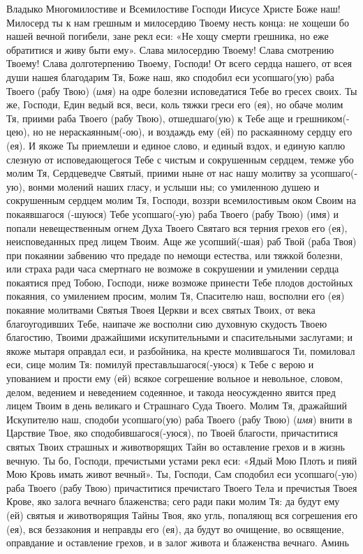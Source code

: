 \begin{mymulticols}
 




Владыко Многомилостиве и Всемилостиве Господи Иисусе Христе Боже наш! Милосерд ты к нам грешным и милосердию Твоему несть конца: не хощеши бо нашей вечной погибели, зане рекл еси: «Не хощу смерти грешника, но еже обратитися и живу быти ему». Слава милосердию Твоему! Слава смотрению Твоему! Слава долготерпению Твоему, Господи! От всего сердца нашего, от всея души нашея благодарим Тя, Боже наш, яко сподобил еси усопшаго(ую) раба Твоего (рабу Твою) ({\itshape имя}) на одре болезни исповедатися Тебе во гресех своих. Ты же, Господи, Един ведый вся, веси, коль тяжки греси его (ея), но обаче молим Тя, приими раба Твоего (рабу Твою), отшедшаго(ую) к Тебе аще и грешником(-цею), но не нераскаянным(-ою), и воздаждь ему (ей) по раскаянному сердцу его (ея). И якоже Ты приемлеши и единое слово, и единый вздох, и единую каплю слезную от исповедающегося Тебе с чистым и сокрушенным сердцем, темже убо молим Тя, Сердцеведче Святый, приими ныне от нас нашу молитву за усопшаго(-ую), вонми молений наших гласу, и услыши ны; со умиленною душею и сокрушенным сердцем молим Тя, Господи, воззри всемилостивым оком Своим на покаявшагося (-шуюся) Тебе усопшаго(-ую) раба Твоего (рабу Твою) (имя) и попали невещественным огнем Духа Твоего Святаго вся терния грехов его (ея), неисповеданных пред лицем Твоим. Аще же усопший(-шая) раб Твой (раба Твоя) при покаянии забвению что предаде по немощи естества, или тяжкой болезни, или страха ради часа смертнаго не возможе в сокрушении и умилении сердца покаятися пред Тобою, Господи, ниже возможе принести Тебе плодов достойных покаяния, со умилением просим, молим Тя, Спасителю наш, восполни его (ея) покаяние молитвами Святыя Твоея Церкви и всех святых Твоих, от века благоугодивших Тебе, наипаче же восполни сию духовную скудость Твоею благостию, Твоими дражайшими искупительными и спасительными заслугами; и якоже мытаря оправдал еси, и разбойника, на кресте молившагося Ти, помиловал еси, сице молим Тя: помилуй преставльшагося(-уюся) к Тебе с верою и упованием и прости ему (ей) всякое согрешение вольное и невольное, словом, делом, ведением и неведением содеянное, и такода неосужденно явится пред лицем Твоим в день великаго и Страшнаго Суда Твоего. Молим Тя, дражайший Искупителю наш, сподоби усопшаго(ую) раба Твоего (рабу Твою) ({\itshape имя}) внити в Царствие Твое, яко сподобившагося(-уюся), по Твоей благости, причаститися святых Твоих страшных и животворящих Тайн во оставление грехов и в жизнь вечную. Ты бо, Господи, пречистыми устами рекл еси: «Ядый Мою Плоть и пияй Мою Кровь имать живот вечный». Ты, Господи, Сам сподобил еси усопшаго(-ую) раба Твоего (рабу Твою) причаститися пречистаго Твоего Тела и пречистыя Твоея Крове, яко залога вечнаго блаженства; сего ради паки молим Тя: да будут ему (ей) святыя и животворящия Тайны Твоя, яко угль, попаляющ вся согрешения его (ея), вся беззакония и неправды его (ея), да будут во очищение, во освящение, оправдание и оставление грехов, и в залог живота и блаженства вечнаго. Аминь 


\end{mymulticols}
